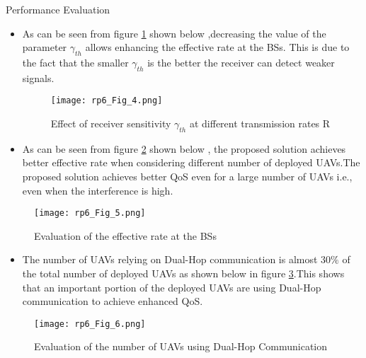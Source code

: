 \documentclass{beamer}
\begin{document}
\begin{frame}{Performance Evaluation}
\begin{itemize}
    \item As can be seen from figure \ref{fig:Receiver Sensitivity} shown below ,decreasing the value of the parameter $\gamma_{th}$ allows enhancing the effective rate at the BSs. This is due to the fact that the smaller $\gamma_{th}$ is the better the receiver can detect weaker signals.
\begin{figure}[!ht]
    \centering
    \texttt{[image: rp6\_Fig\_4.png]}
    \caption{Effect of receiver sensitivity $\gamma_{th}$ at different transmission rates R}
    \label{fig:Receiver Sensitivity}
\end{figure}
\end{itemize}
\end{frame}

\begin{frame}{}
 \begin{itemize}
     \item As can be seen from figure \ref{fig:Effective Rate} shown below , the proposed solution achieves better effective rate when considering different number of deployed UAVs.The proposed solution achieves better QoS even for a large number of UAVs i.e., even when the interference is high.
 \end{itemize}
 \begin{figure}[!ht]
    \centering
    \texttt{[image: rp6\_Fig\_5.png]}
    \caption{Evaluation of the effective rate at the BSs}
    \label{fig:Effective Rate}
\end{figure} 
\end{frame}

\begin{frame}{}
\begin{itemize}
    \item The number of UAVs relying on Dual-Hop communication is almost $30\%$ of the total number of deployed UAVs as shown below in figure \ref{fig:Number of UAV using Dual-Hop}.This shows that an important portion of the deployed UAVs are using Dual-Hop communication to achieve enhanced QoS.
\end{itemize}
\begin{figure}[!ht]
    \centering
    \texttt{[image: rp6\_Fig\_6.png]}
    \caption{Evaluation of the number of UAVs using Dual-Hop Communication }
    \label{fig:Number of UAV using Dual-Hop}
\end{figure}
\end{frame}
\end{document}
